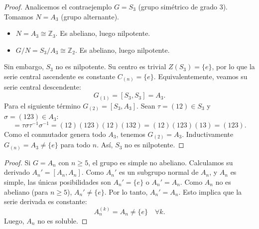 \begin{proof}
    Analicemos el contraejemplo $G = S_3$ (grupo simétrico de grado 3).
    Tomamos $N = A_3$ (grupo alternante).
    \begin{itemize}
        \item $N = A_3 \cong \mathbb{Z}_3$. Es abeliano, luego nilpotente.
        \item $G/N = S_3/A_3 \cong \mathbb{Z}_2$. Es abeliano, luego nilpotente.
    \end{itemize}
    Sin embargo, $S_3$ no es nilpotente. Su centro es trivial $Z(S_3)=\{e\}$, por lo que la serie central ascendente es constante $C_{(n)}=\{e\}$.
    Equivalentemente, veamos su serie central descendente:
    \begin{equation*}
        G_{(1)} = [S_3, S_3] = A_3.
    \end{equation*}
    Para el siguiente término $G_{(2)} = [S_3, A_3]$. Sean $\tau = (12) \in S_3$ y $\sigma = (123) \in A_3$:
    \begin{equation*}
        [\tau, \sigma] = \tau \sigma \tau^{-1} \sigma^{-1} = (12)(123)(12)(132) = (12)(123)(13) = (123).
    \end{equation*}
    Como el conmutador genera todo $A_3$, tenemos $G_{(2)} = A_3$.
    Inductivamente $G_{(n)} = A_3 \ne \{e\}$ para todo $n$. Así, $S_3$ no es nilpotente.
\end{proof}


\begin{proof}
    Si $G = A_n$ con $n \ge 5$, el grupo es simple no abeliano.
    Calculamos su derivado $A_n' = [A_n, A_n]$. Como $A_n'$ es un subgrupo normal de $A_n$, y $A_n$ es simple, las únicas posibilidades son $A_n' = \{e\}$ o $A_n' = A_n$.
    Como $A_n$ no es abeliano (para $n \ge 5$), $A_n' \ne \{e\}$.
    Por lo tanto, $A_n' = A_n$.
    Esto implica que la serie derivada es constante:
    \begin{equation*}
        A_n^{(k)} = A_n \ne \{e\} \quad \forall k.
    \end{equation*}
    Luego, $A_n$ no es soluble.
\end{proof}


